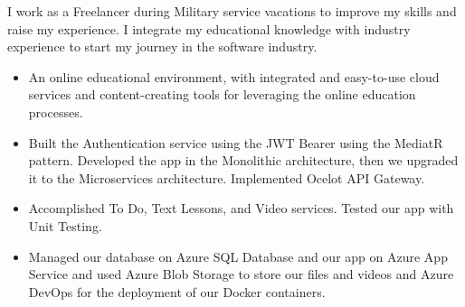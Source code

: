 \documentclass[10pt,a4paper,ragged2e,withhyper]{altacv}
\begin{document}
\begin{paracol}{2}






I work as a Freelancer during Military service vacations to improve my skills and raise my experience. I integrate my educational knowledge with industry experience to start my journey in the software industry.


\begin{itemize}
\item An online educational environment, with integrated and easy-to-use cloud services and content-creating tools for leveraging the online education processes.
\item Built the Authentication service using the JWT Bearer using the MediatR pattern. Developed the app in the Monolithic architecture, then we upgraded it to the Microservices architecture. Implemented Ocelot API Gateway.
\item Accomplished To Do, Text Lessons, and Video services. Tested our app with Unit Testing.
\item Managed our database on Azure SQL Database and our app on Azure App Service and used Azure Blob Storage to store our files and videos and Azure DevOps for the deployment of our Docker containers.
\end{itemize}


\end{paracol}
\end{document}
